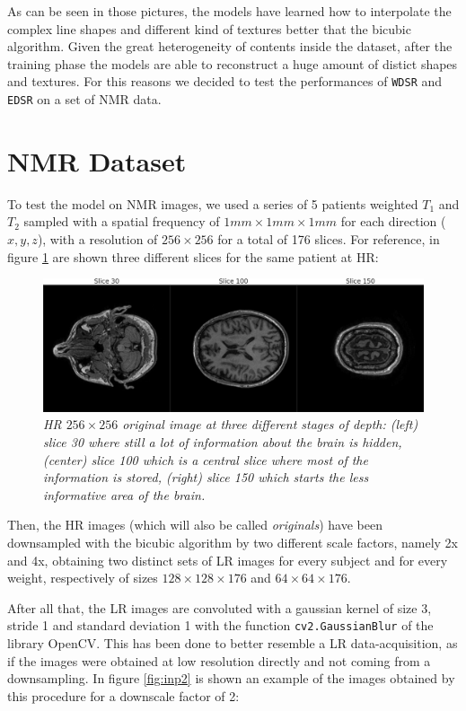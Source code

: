 \documentclass[12pt,a4paper]{report}
\begin{document}
As can be seen in those pictures, the models have learned how to interpolate the complex line shapes and different kind of textures better that the bicubic algorithm.
Given the great heterogeneity of contents inside the dataset, after the training phase the models are able to reconstruct a huge amount of distict shapes and textures. For this reasons we decided to test the performances of {\tt WDSR} and {\tt EDSR} on a set of NMR data. 

\section{NMR Dataset}

To test the model on NMR images, we used a series of 5 patients weighted $T_1$ and $T_2$ sampled with a spatial frequency of $1mm \times 1mm \times 1mm$ for each direction ($x, y, z$), with a resolution of $256 \times 256$ for a total of 176 slices. For reference, in figure \ref{fig:orig_ref} are shown three different slices for the same patient at HR:

\begin{figure}[H]
 \centering
 \includegraphics[scale=0.31]{./images/orig_slice_comp.png}
 \caption{\it HR $256 \times 256$ original image at three different stages of depth: (left) slice 30 where still a lot of information about the brain is hidden, (center) slice 100 which is a central slice where most of the information is stored, (right) slice 150 which starts the less informative area of the brain.}
 \label{fig:orig_ref}
\end{figure}

Then, the HR images (which will also be called {\it originals}) have been  downsampled with the bicubic algorithm by two different scale factors, namely 2x and 4x, obtaining two distinct sets of LR images for every subject and for every weight, respectively of sizes $128 \times 128 \times 176$ and $64 \times 64 \times 176$.

After all that, the LR images are convoluted with a gaussian kernel of size 3, stride 1 and standard deviation 1 with the function \texttt{cv2.GaussianBlur} of the library OpenCV. 
This has been done to better resemble a LR data-acquisition, as if the images were obtained at low resolution directly and not coming from a downsampling.
In figure \ref{fig:inp2} is shown an example of the images obtained by this procedure for a downscale factor of 2:
\end{document}
